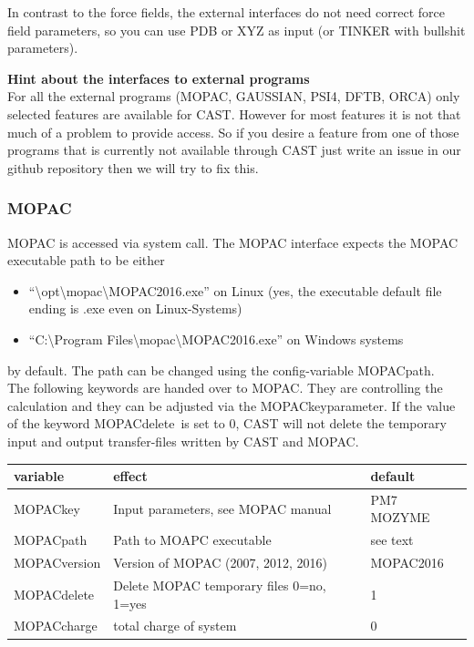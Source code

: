\documentclass[10pt,a4paper]{article} %
\begin{document}
	In contrast to the force fields, the external interfaces do not need correct force field parameters, so you can use PDB or XYZ as input (or TINKER with bullshit parameters).
	
	\textbf{Hint about the interfaces to external programs}\\
	For all the external programs (MOPAC, GAUSSIAN, PSI4, DFTB, ORCA) only selected features are available for CAST. However for most features it is not that much of a problem to provide access. So if you desire a feature from one of those programs that is currently not available through CAST just write an issue in our github repository then we will try to fix this.

		\subsubsection{MOPAC}
		\ac{MOPAC} is accessed via system call. The \ac{MOPAC} interface expects the \ac{MOPAC} executable path to be either
		\begin{itemize}
			\item ``\textbackslash opt\textbackslash mopac\textbackslash MOPAC2016.exe'' on Linux (yes, the executable default file ending is .exe even on Linux-Systems)
			\item ``C:\textbackslash Program Files\textbackslash mopac\textbackslash MOPAC2016.exe'' on Windows systems
		\end{itemize} by default. The path can be changed using the config-variable \glqq MOPACpath\grqq.~\\
		The following keywords are handed over to \ac{MOPAC}. They are controlling the calculation and they can be adjusted via the \glqq MOPACkey\grqq parameter.
		If the value of the keyword \glqq MOPACdelete\grqq \ is set to 0, \ac{CAST} will not delete the temporary input and output transfer-files written by \ac{CAST} and \ac{MOPAC}.

		\begin{longtable}{|p{3cm}|p{5cm}|p{3cm}|}
			variable & effect & default \\
			\hline
			MOPACkey & Input parameters, see MOPAC manual & PM7 MOZYME\\
			MOPACpath & Path to MOAPC executable & see text\\
			MOPACversion & Version of MOPAC (2007, 2012, 2016) & MOPAC2016\\
			MOPACdelete & Delete MOPAC temporary files 0=no, 1=yes & 1\\
			MOPACcharge & total charge of system & 0\\
		\end{longtable}
		
\end{document}
